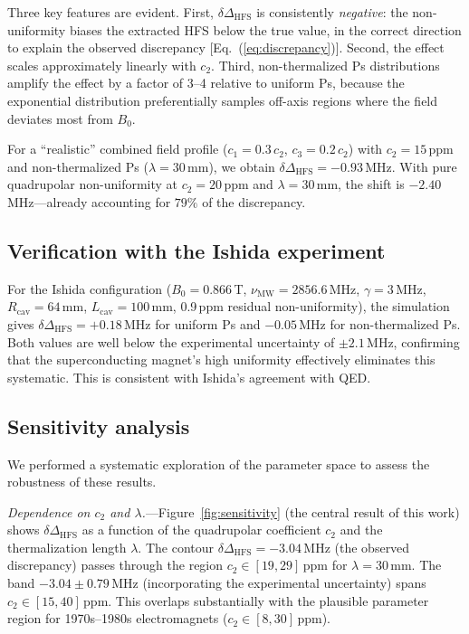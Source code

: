 \documentclass[twocolumn,pra,aps,superscriptaddress,floatfix,10pt]{revtex4-2}
\begin{document}
Three key features are evident. First, $\delta\Delta_\mathrm{HFS}$ is consistently \emph{negative}: the non-uniformity biases the extracted HFS below the true value, in the correct direction to explain the observed discrepancy [Eq.~(\ref{eq:discrepancy})]. Second, the effect scales approximately linearly with $c_2$. Third, non-thermalized Ps distributions amplify the effect by a factor of 3--4 relative to uniform Ps, because the exponential distribution preferentially samples off-axis regions where the field deviates most from $B_0$.

For a ``realistic'' combined field profile ($c_1 = 0.3\,c_2$, $c_3 = 0.2\,c_2$) with $c_2 = 15$\,ppm and non-thermalized Ps ($\lambda = 30$\,mm), we obtain $\delta\Delta_\mathrm{HFS} = -0.93$\,MHz. With pure quadrupolar non-uniformity at $c_2 = 20$\,ppm and $\lambda = 30$\,mm, the shift is $-2.40$\,MHz---already accounting for $79\%$ of the discrepancy.

\subsection{Verification with the Ishida experiment}
\label{sec:ishida}

For the Ishida configuration ($B_0 = 0.866$\,T, $\nu_\mathrm{MW} = 2856.6$\,MHz, $\gamma = 3$\,MHz, $R_\mathrm{cav} = 64$\,mm, $L_\mathrm{cav} = 100$\,mm, 0.9\,ppm residual non-uniformity), the simulation gives $\delta\Delta_\mathrm{HFS} = +0.18$\,MHz for uniform Ps and $-0.05$\,MHz for non-thermalized Ps. Both values are well below the experimental uncertainty of $\pm 2.1$\,MHz, confirming that the superconducting magnet's high uniformity effectively eliminates this systematic. This is consistent with Ishida's agreement with QED.

\subsection{Sensitivity analysis}
\label{sec:sensitivity}

We performed a systematic exploration of the parameter space to assess the robustness of these results.

\textit{Dependence on $c_2$ and $\lambda$.}---Figure~\ref{fig:sensitivity} (the central result of this work) shows $\delta\Delta_\mathrm{HFS}$ as a function of the quadrupolar coefficient $c_2$ and the thermalization length $\lambda$. The contour $\delta\Delta_\mathrm{HFS} = -3.04$\,MHz (the observed discrepancy) passes through the region $c_2 \in [19, 29]$\,ppm for $\lambda = 30$\,mm. The band $-3.04 \pm 0.79$\,MHz (incorporating the experimental uncertainty) spans $c_2 \in [15, 40]$\,ppm. This overlaps substantially with the plausible parameter region for 1970s--1980s electromagnets ($c_2 \in [8, 30]$\,ppm).
\end{document}
